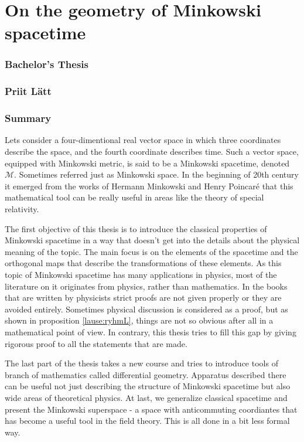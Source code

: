 \documentclass[12pt]{article}
\theoremstyle{plain}
\theoremstyle{definition}
\numberwithin{equation}{section}
\def\M{{\mathcal M}}
\begin{document}
\newpage
\section*{On the geometry of Minkowski spacetime}

\subsubsection*{Bachelor's Thesis}
\subsubsection*{Priit Lätt}
\subsubsection*{Summary}
Lets consider a four-dimentional real vector space in which 
three coordinates describe the space, and the fourth coordinate 
describes time. Such a vector space, equipped with Minkowski 
metric, is said to be a Minkowski spacetime, denoted $\M$. 
Sometimes referred just as Minkowski space. In the beginning 
of 20th century it emerged from the works of Hermann Minkowski 
and Henry Poincar\'e that this mathematical tool can be 
really useful in areas like the theory of special relativity.

The first objective of this thesis is to introduce the 
classical properties of Minkowski spacetime in a way that 
doesn't get into the details about the physical meaning 
of the topic. The main focus is on the elements of the 
spacetime and the orthogonal maps that describe the 
transformations of these elements. As this topic of 
Minkowski spacetime has many applications in physics, 
most of the literature on it originates from physics, 
rather than mathematics. In the books that are written 
by physicists strict proofs are not given properly or 
they are avoided entirely. Sometimes physical discussion 
is considered as a proof, but as shown in proposition 
\ref{lause:ryhmL}, things are not so obvious after all 
in a mathematical point of view. In contrary, this thesis 
tries to fill this gap by giving rigorous proof to all 
the statements that are made.

The last part of the thesis takes a new course and tries 
to introduce tools of branch of mathematics called 
differential geometry. Apparatus described there can be 
useful not just describing the structure of Minkowski 
spacetime but also wide areas of theoretical physics. 
At last, we generalize classical spacetime and present 
the Minkowski superspace - a space with anticommuting 
coordiantes that has become a useful tool in the 
field theory. This is all done in a bit less formal way.
\end{document}
